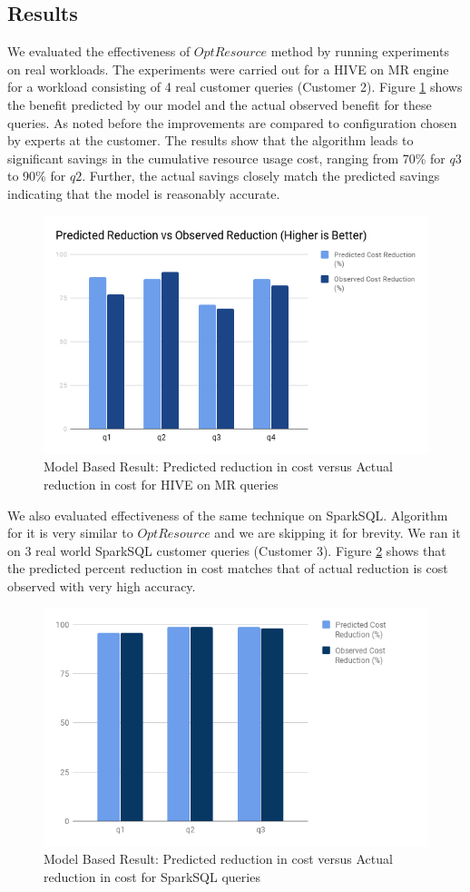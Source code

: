 \subsection{Results}
We evaluated the effectiveness of $OptResource$ method by running experiments on real workloads. The experiments were carried out for a HIVE on MR engine for a workload consisting of 4 real customer queries (Customer 2). 
Figure \ref{fig:modelbasedresult} shows the benefit predicted by our model and the actual observed benefit for these queries. As noted before the improvements are compared to configuration chosen by experts at the customer. The results show that the algorithm leads to significant savings in the cumulative resource usage cost, ranging from 70\% for $q3$ to 90\% for $q2$. Further, the actual savings closely match the predicted savings indicating that the model is reasonably accurate.

\begin{figure}[h]
	\includegraphics[width=\linewidth]{chart.png}
	\caption{Model Based Result: Predicted reduction in cost versus Actual reduction in cost for HIVE on MR queries}
	\label{fig:modelbasedresult}
\end{figure}

We also evaluated effectiveness of the same technique on SparkSQL. Algorithm for it is very similar to $OptResource$ and we are skipping it for brevity. We ran it on 3 real world SparkSQL customer queries (Customer 3). Figure \ref{fig:modelbasedresultspark} shows that the predicted percent reduction in cost matches that of actual reduction is cost observed with very high accuracy.

\begin{figure}[h]
	\includegraphics[width=\linewidth]{chart_spark.png}
	\caption{Model Based Result: Predicted reduction in cost versus Actual reduction in cost for SparkSQL queries}
	\label{fig:modelbasedresultspark}
\end{figure}
